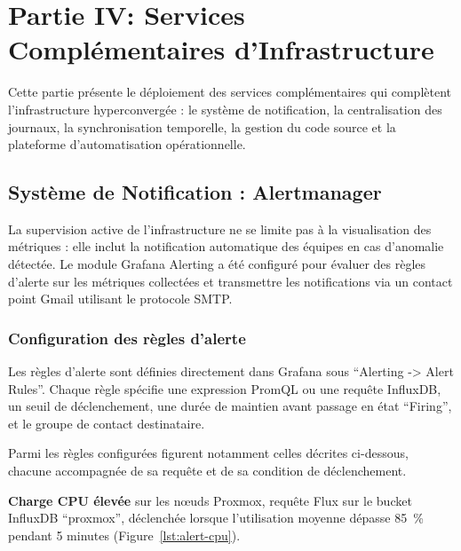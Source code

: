 \section{Partie IV: Services Complémentaires d'Infrastructure}

\par Cette partie présente le déploiement des services complémentaires qui complètent l'infrastructure hyperconvergée : le système de notification, la centralisation des journaux, la synchronisation temporelle, la gestion du code source et la plateforme d'automatisation opérationnelle.

\subsection{Système de Notification : Alertmanager}

\par La supervision active de l'infrastructure ne se limite pas à la visualisation des métriques : elle inclut la notification automatique des équipes en cas d'anomalie détectée. Le module Grafana Alerting a été configuré pour évaluer des règles d'alerte sur les métriques collectées et transmettre les notifications via un contact point Gmail utilisant le protocole SMTP.

\subsubsection{Configuration des règles d'alerte}

\par Les règles d'alerte sont définies directement dans Grafana sous ``Alerting -> Alert Rules''. Chaque règle spécifie une expression PromQL ou une requête InfluxDB, un seuil de déclenchement, une durée de maintien avant passage en état ``Firing'', et le groupe de contact destinataire.\\

\par Parmi les règles configurées figurent notamment celles décrites ci-dessous, chacune accompagnée de sa requête et de sa condition de déclenchement.\\

\medskip
\par \textbf{\textcolor{bleu}{Charge CPU élevée}} sur les nœuds Proxmox, requête Flux sur le bucket InfluxDB ``proxmox'', déclenchée lorsque l'utilisation moyenne dépasse 85~\% pendant 5 minutes (Figure~\ref{lst:alert-cpu}).\\

